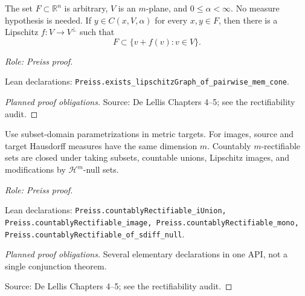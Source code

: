\begin{lemma}
\label{lem:cone-graph}








The set \(F\subset\mathbb R^n\) is arbitrary, \(V\) is an \(m\)-plane, and \(0\leq\alpha<\infty\). No measure hypothesis is needed.
If \(y\in C(x,V,\alpha)\) for every \(x,y\in F\), then there is a Lipschitz \(f:V\to V^\perp\) such that
\[
 F\subset\{v+f(v):v\in V\}.
\]
\par\emph{Role: Preiss proof.}
\par Lean declarations: \texttt{Preiss.exists\_lipschitzGraph\_of\_pairwise\_mem\_cone}.
\end{lemma}
\begin{proof}[Planned proof obligations]

\par Source: De Lellis Chapters 4--5; see the rectifiability audit.
\end{proof}

\begin{lemma}
\label{lem:carrier-closure}








Use subset-domain parametrizations in metric targets. For images, source and target Hausdorff measures have the same dimension \(m\).
Countably \(m\)-rectifiable sets are closed under taking subsets, countable unions, Lipschitz images, and modifications by \(\mathcal H^m\)-null sets.
\par\emph{Role: Preiss proof.}
\par Lean declarations: \texttt{Preiss.countablyRectifiable\_iUnion, Preiss.countablyRectifiable\_image, Preiss.countablyRectifiable\_mono, Preiss.countablyRectifiable\_of\_sdiff\_null}.
\end{lemma}
\begin{proof}[Planned proof obligations]
Several elementary declarations in one API, not a single conjunction theorem.
\par Source: De Lellis Chapters 4--5; see the rectifiability audit.
\end{proof}

